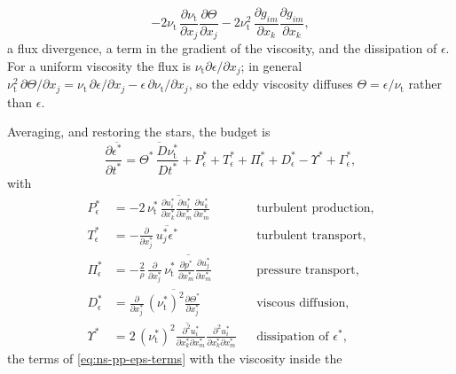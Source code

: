 \documentclass{article}
\begin{document}
\begin{itemize}
\begin{equation*}
    - 2 \nu_{\mathrm{t}}\, \frac{\partial \nu_{\mathrm{t}}}{\partial x_j} \frac{\partial \Theta}{\partial x_j}
    - 2 \nu_{\mathrm{t}}^2\, \frac{\partial g_{im}}{\partial x_k} \frac{\partial g_{im}}{\partial x_k} ,
  \end{equation*}
  a flux divergence, a term in the gradient of the viscosity, and the
  dissipation of $\epsilon$. For a uniform viscosity the flux is
  $\nu_{\mathrm{t}} \partial \epsilon / \partial x_j$; in general
  $\nu_{\mathrm{t}}^2\, \partial \Theta / \partial x_j
  = \nu_{\mathrm{t}}\, \partial \epsilon / \partial x_j - \epsilon\, \partial \nu_{\mathrm{t}} / \partial x_j$,
  so the eddy viscosity diffuses $\Theta = \epsilon / \nu_{\mathrm{t}}$
  rather than $\epsilon$.
\end{itemize}
Averaging, and restoring the stars, the budget is
\begin{equation}\label{eq:ns-pp-smag-eps-rate-raw}
  \frac{\partial \overline{\epsilon^*}}{\partial t^*}
  = \overline{\Theta^*\, \frac{D \nu_{\mathrm{t}}^*}{D t^*}}
  + P_\epsilon^* + T_\epsilon^* + \Pi_\epsilon^* + D_\epsilon^* - \Upsilon^*
  + \Gamma_\epsilon^* ,
\end{equation}
with
\begin{equation}\label{eq:ns-pp-smag-eps-terms}
\begin{aligned}
  P_\epsilon^* &= -2\, \overline{\nu_{\mathrm{t}}^*\, \frac{\partial u_i^*}{\partial x_k^*} \frac{\partial u_i^*}{\partial x_m^*} \frac{\partial u_k^*}{\partial x_m^*}}
  && \text{turbulent production,} \\
  T_\epsilon^* &= -\frac{\partial}{\partial x_j^*}\, \overline{u_j^* \epsilon^*}
  && \text{turbulent transport,} \\
  \Pi_\epsilon^* &= -\frac{2}{\rho}\, \frac{\partial}{\partial x_j^*}\, \overline{\nu_{\mathrm{t}}^*\, \frac{\partial p^*}{\partial x_m^*} \frac{\partial u_j^*}{\partial x_m^*}}
  && \text{pressure transport,} \\
  D_\epsilon^* &= \frac{\partial}{\partial x_j^*}\, \overline{\left(\nu_{\mathrm{t}}^*\right)^2 \frac{\partial \Theta^*}{\partial x_j^*}}
  && \text{viscous diffusion,} \\
  \Upsilon^* &= 2\, \overline{\left(\nu_{\mathrm{t}}^*\right)^2 \frac{\partial^2 u_i^*}{\partial x_k^* \partial x_m^*} \frac{\partial^2 u_i^*}{\partial x_k^* \partial x_m^*}}
  && \text{dissipation of } \epsilon^* ,
\end{aligned}
\end{equation}
the terms of \eqref{eq:ns-pp-eps-terms} with the viscosity inside the
\end{document}
